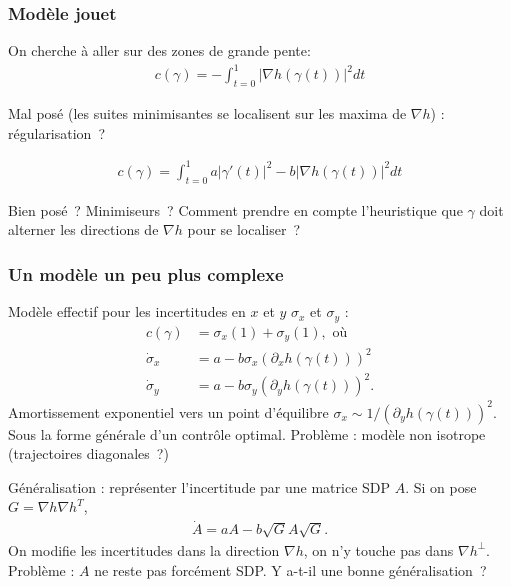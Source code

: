 \documentclass[11pt]{beamer}
\begin{document}
\begin{frame}
  \frametitle{Modèle jouet}
  On cherche à aller sur des zones de grande pente:
  \begin{align*}
    c(\gamma) = -\int_{t=0}^{1} |\nabla h(\gamma(t))|^{2}  dt
  \end{align*}

  Mal posé (les suites minimisantes se localisent sur les maxima de
  $\nabla h$) : régularisation~?
  
\begin{align*}
  c(\gamma) =  \int_{t=0}^{1} a |\gamma'(t)|^{2} - b |\nabla
  h(\gamma(t))|^{2} dt
\end{align*}

Bien posé~? Minimiseurs~? Comment prendre en compte l'heuristique que
$\gamma$ doit alterner les directions de $\nabla h$ pour se localiser~?


\end{frame}
\begin{frame}
  \frametitle{Un modèle un peu plus complexe}
Modèle effectif pour les incertitudes en $x$ et $y$ $\sigma_{x}$ et
$\sigma_{y}$ :
\begin{align*}
  c(\gamma) &= \sigma_{x}(1) + \sigma_{y}(1), \text{ où}\\
  \dot \sigma_{x} &= a - b \sigma_{x} (\partial_{x} h(\gamma(t)))^{2}\\
  \dot \sigma_{y} &= a - b \sigma_{y} (\partial_{y} h(\gamma(t)))^{2}.
\end{align*}
Amortissement exponentiel vers un point d'équilibre $\sigma_{x} \sim
1/(\partial_{y} h(\gamma(t)))^{2}$. Sous la forme générale d'un
contrôle optimal. Problème : modèle non isotrope (trajectoires
diagonales~?)

Généralisation : représenter l'incertitude par une matrice SDP $A$. Si
on pose $G = \nabla h \nabla h^{T}$,
\begin{align*}
  \dot A = a A - b \sqrt G A \sqrt G.
\end{align*}
On modifie les incertitudes dans la direction $\nabla h$, on n'y
touche pas dans $\nabla h^{\perp}$. Problème : $A$ ne reste
pas forcément SDP. Y a-t-il une bonne généralisation~?
\end{frame}
\end{document}
